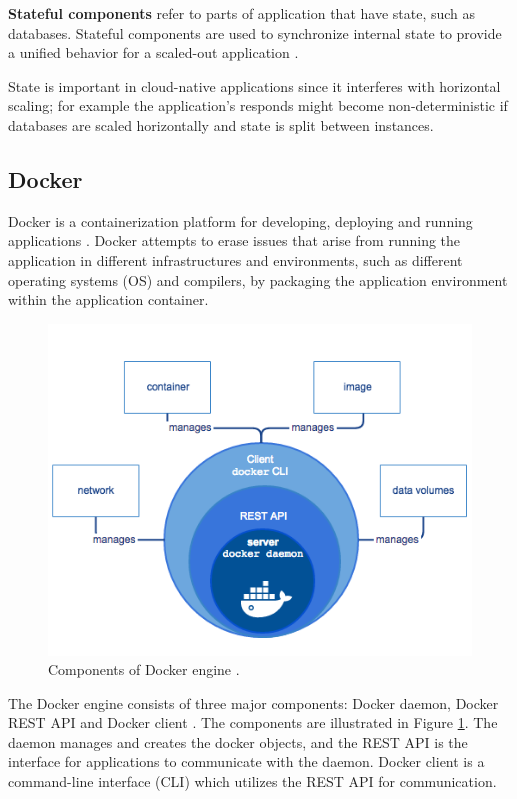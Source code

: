 \documentclass[article]{aaltoseries}
\begin{document}
\textbf{Stateful components} refer to parts of application that have state, such as databases. Stateful components are used to synchronize internal state to provide a unified behavior for a scaled-out application \cite{fehling2014cloud}.

State is important in cloud-native applications since it interferes with horizontal scaling; for example the application's responds might become non-deterministic if databases are scaled horizontally and state is split between instances.

\subsection{Docker}
\label{2.2}

Docker is a containerization platform for developing, deploying and running applications \cite{docker}. Docker attempts to erase issues that arise from running the application in different infrastructures and environments, such as different operating systems (OS) and compilers, by packaging the application environment within the application container.

\begin{figure}[hbt!]
    \centering
    \includegraphics[width=140mm]{figures/docker-engine.png}
    \caption{Components of Docker engine \cite{docker}.}
    \label{fig:docker-engine}
\end{figure}
\newpage

The Docker engine consists of three major components: Docker daemon, Docker REST API and Docker client \cite{docker}. The components are illustrated in Figure \ref{fig:docker-engine}. The daemon manages and creates the docker objects, and the REST API is the interface for applications to communicate with the daemon. Docker client is a command-line interface (CLI) which utilizes the REST API for communication.
\end{document}
